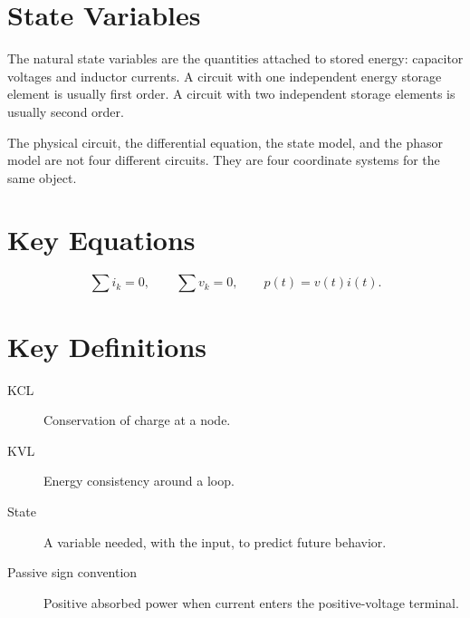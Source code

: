 \section{State Variables}
The natural state variables are the quantities attached to stored energy:
capacitor voltages and inductor currents. A circuit with one independent energy
storage element is usually first order. A circuit with two independent storage
elements is usually second order.

\begin{physicalbox}
The physical circuit, the differential equation, the state model, and the phasor
model are not four different circuits. They are four coordinate systems for the
same object.
\end{physicalbox}

\section{Key Equations}
\[
\sum i_k=0,\qquad \sum v_k=0,\qquad
p(t)=v(t)i(t).
\]

\section{Key Definitions}
\begin{description}
\item[KCL] Conservation of charge at a node.
\item[KVL] Energy consistency around a loop.
\item[State] A variable needed, with the input, to predict future behavior.
\item[Passive sign convention] Positive absorbed power when current enters the
positive-voltage terminal.
\end{description}

